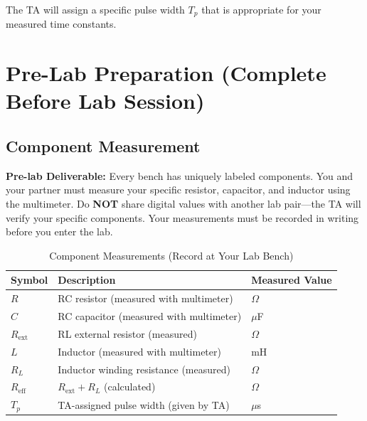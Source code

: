 \documentclass[11pt,letterpaper]{article}
\providecommand{\pldECE}[1]{\textcolor{BrickRed}{\textbf{Pre-lab Deliverable:} #1}}
\begin{document}
\noindent
The TA will assign a specific pulse width $T_p$ that is appropriate for your measured time constants.

\clearpage

\section{Pre-Lab Preparation (Complete Before Lab Session)}

\subsection{Component Measurement}

\pldECE{Every bench has uniquely labeled components. You and your partner must measure your specific resistor, capacitor, and inductor using the multimeter. Do \textbf{NOT} share digital values with another lab pair—the TA will verify your specific components. Your measurements must be recorded in writing before you enter the lab.}

\begin{table}[H]
    \centering
    \caption{Component Measurements (Record at Your Lab Bench)}
    \label{tab:bench_components}
    \begin{tabularx}{\linewidth}{l X l}
    \toprule
    \textbf{Symbol} & \textbf{Description} & \textbf{Measured Value}\\
    \midrule
    $R$ & RC resistor (measured with multimeter) & \underline{\hspace{3.0cm}} $\Omega$ \\
    $C$ & RC capacitor (measured with multimeter) & \underline{\hspace{3.0cm}} $\mu$F \\
    $R_{\mathrm{ext}}$ & RL external resistor (measured) & \underline{\hspace{3.0cm}} $\Omega$ \\
    $L$ & Inductor (measured with multimeter) & \underline{\hspace{3.0cm}} mH \\
    $R_L$ & Inductor winding resistance (measured) & \underline{\hspace{3.0cm}} $\Omega$ \\
    $R_{\mathrm{eff}}$ & $R_{\mathrm{ext}} + R_L$ (calculated) & \underline{\hspace{3.0cm}} $\Omega$ \\
    $T_p$ & TA-assigned pulse width (given by TA) & \underline{\hspace{3.0cm}} $\mu$s \\
    \bottomrule
    \end{tabularx}
\end{table}
\end{document}
